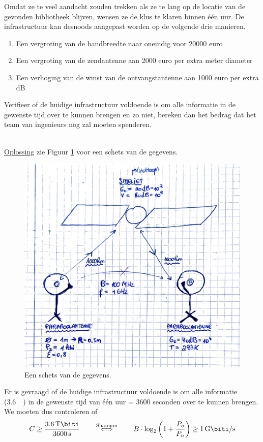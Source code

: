 \documentclass[kulak]{kulakarticle}
\begin{document}
	Omdat ze te veel aandacht zouden trekken als ze te lang op de locatie van de gevonden bibliotheek blijven, wensen ze de klus te klaren binnen één uur. De infrastructuur kan desnoods aangepast worden op de volgende drie manieren. \begin{enumerate}
		\item Een vergroting van de bandbreedte naar oneindig voor 20000 euro
		\item Een vergroting van de zendantenne aan 2000 euro per extra meter diameter
		\item Een verhoging van de winst van de ontvangstantenne aan 1000 euro per extra dB
	\end{enumerate}

	Verifieer of de huidige infrastructuur voldoende is om alle informatie in de gewenste tijd over te kunnen brengen en zo niet, bereken dan het bedrag dat het team van ingenieurs nog zal moeten spenderen.

	\hfill \\
	\underline{Oplossing} zie Figuur \ref{fig:satelliet} voor een schets van de gegevens.

	\begin{figure}[h!]
		\centering
		\includegraphics[width=.68\textwidth]{satelliet}
		\caption{Een schets van de gegevens.}
		\label{fig:satelliet}
	\end{figure}

	Er is gevraagd of de huidige infrastructuur voldoende is om alle informatie (\SI{3.6}{\tera\biti}) in de gewenste tijd van één uur = 3600 seconden over te kunnen brengen. We moeten dus controleren of
	\begin{equation}
		\label{shannon}
		C \geq \frac{\SI{3.6}{\tera\biti}}{\SI{3600}{\second}} \qquad \overset{\text{Shannon}}{\Longleftrightarrow} \qquad B \cdot \log_2\left(1+\frac{P_o}{P_n}\right) \geq \SI{1}{\giga\biti\per\second}
	\end{equation}
\end{document}
